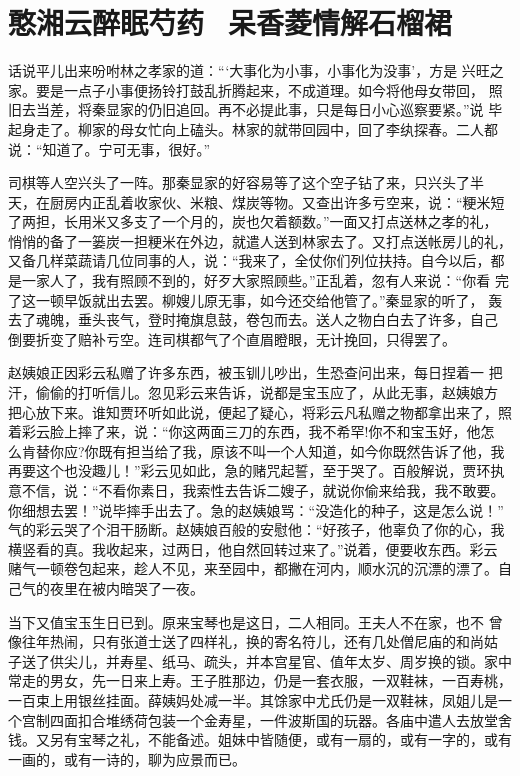 \chapter{憨湘云醉眠芍药~呆香菱情解石榴裙}

话说平儿出来吩咐林之孝家的道：“‘大事化为小事，小事化为没事’，方是
兴旺之家。要是一点子小事便扬铃打鼓乱折腾起来，不成道理。如今将他母女带回，
照旧去当差，将秦显家的仍旧追回。再不必提此事，只是每日小心巡察要紧。”说
毕起身走了。柳家的母女忙向上磕头。林家的就带回园中，回了李纨探春。二人都
说：“知道了。宁可无事，很好。”

司棋等人空兴头了一阵。那秦显家的好容易等了这个空子钻了来，只兴头了半
天，在厨房内正乱着收家伙、米粮、煤炭等物。又查出许多亏空来，说：“粳米短
了两担，长用米又多支了一个月的，炭也欠着额数。”一面又打点送林之孝的礼，
悄悄的备了一篓炭一担粳米在外边，就遣人送到林家去了。又打点送帐房儿的礼，
又备几样菜蔬请几位同事的人，说：“我来了，全仗你们列位扶持。自今以后，都
是一家人了，我有照顾不到的，好歹大家照顾些。”正乱着，忽有人来说：“你看
完了这一顿早饭就出去罢。柳嫂儿原无事，如今还交给他管了。”秦显家的听了，
轰去了魂魄，垂头丧气，登时掩旗息鼓，卷包而去。送人之物白白去了许多，自己
倒要折变了赔补亏空。连司棋都气了个直眉瞪眼，无计挽回，只得罢了。

赵姨娘正因彩云私赠了许多东西，被玉钏儿吵出，生恐查问出来，每日捏着一
把汗，偷偷的打听信儿。忽见彩云来告诉，说都是宝玉应了，从此无事，赵姨娘方
把心放下来。谁知贾环听如此说，便起了疑心，将彩云凡私赠之物都拿出来了，照
着彩云脸上摔了来，说：“你这两面三刀的东西，我不希罕!你不和宝玉好，他怎
么肯替你应?你既有担当给了我，原该不叫一个人知道，如今你既然告诉了他，我
再要这个也没趣儿！”彩云见如此，急的赌咒起誓，至于哭了。百般解说，贾环执
意不信，说：“不看你素日，我索性去告诉二嫂子，就说你偷来给我，我不敢要。
你细想去罢！”说毕摔手出去了。急的赵姨娘骂：“没造化的种子，这是怎么说！”
气的彩云哭了个泪干肠断。赵姨娘百般的安慰他：“好孩子，他辜负了你的心，我
横竖看的真。我收起来，过两日，他自然回转过来了。”说着，便要收东西。彩云
赌气一顿卷包起来，趁人不见，来至园中，都撇在河内，顺水沉的沉漂的漂了。自
己气的夜里在被内暗哭了一夜。

当下又值宝玉生日已到。原来宝琴也是这日，二人相同。王夫人不在家，也不
曾像往年热闹，只有张道士送了四样礼，换的寄名符儿，还有几处僧尼庙的和尚姑
子送了供尖儿，并寿星、纸马、疏头，并本宫星官、值年太岁、周岁换的锁。家中
常走的男女，先一日来上寿。王子胜那边，仍是一套衣服，一双鞋袜，一百寿桃，
一百束上用银丝挂面。薛姨妈处减一半。其馀家中尤氏仍是一双鞋袜，凤姐儿是一
个宫制四面扣合堆绣荷包装一个金寿星，一件波斯国的玩器。各庙中遣人去放堂舍
钱。又另有宝琴之礼，不能备述。姐妹中皆随便，或有一扇的，或有一字的，或有
一画的，或有一诗的，聊为应景而已。

